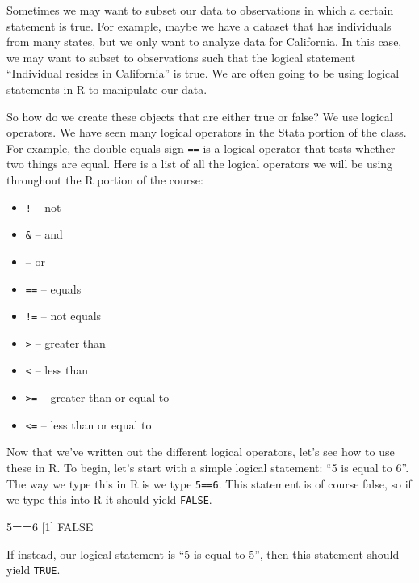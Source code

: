 \documentclass[
]{book}
\newenvironment{Shaded}{\begin{snugshade}}{\end{snugshade}}
\newcommand{\ConstantTok}[1]{\textcolor[rgb]{0.56,0.35,0.01}{#1}}
\newcommand{\DecValTok}[1]{\textcolor[rgb]{0.00,0.00,0.81}{#1}}
\newcommand{\NormalTok}[1]{#1}
\newcommand{\SpecialCharTok}[1]{\textcolor[rgb]{0.81,0.36,0.00}{\textbf{#1}}}
\begin{document}
Sometimes we may want to subset our data to observations in which a certain statement is true. For example, maybe we have a dataset that has individuals from many states, but we only want to analyze data for California. In this case, we may want to subset to observations such that the logical statement ``Individual resides in California'' is true. We are often going to be using logical statements in R to manipulate our data.

So how do we create these objects that are either true or false? We use logical operators. We have seen many logical operators in the Stata portion of the class. For example, the double equals sign \texttt{==} is a logical operator that tests whether two things are equal. Here is a list of all the logical operators we will be using throughout the R portion of the course:

\begin{itemize}
\item
  \texttt{!} -- not
\item
  \texttt{\&} -- and
\item
  \texttt{\textbar{}} -- or
\item
  \texttt{==} -- equals
\item
  \texttt{!=} -- not equals
\item
  \texttt{\textgreater{}} -- greater than
\item
  \texttt{\textless{}} -- less than
\item
  \texttt{\textgreater{}=} -- greater than or equal to
\item
  \texttt{\textless{}=} -- less than or equal to
\end{itemize}

Now that we've written out the different logical operators, let's see how to use these in R. To begin, let's start with a simple logical statement: ``5 is equal to 6''. The way we type this in R is we type \texttt{5==6}. This statement is of course false, so if we type this into R it should yield \texttt{FALSE}.

\begin{Shaded}
\begin{Highlighting}[]
\DecValTok{5}\SpecialCharTok{==}\DecValTok{6}
\NormalTok{[}\DecValTok{1}\NormalTok{] }\ConstantTok{FALSE}
\end{Highlighting}
\end{Shaded}

If instead, our logical statement is ``5 is equal to 5'', then this statement should yield \texttt{TRUE}.
\end{document}
